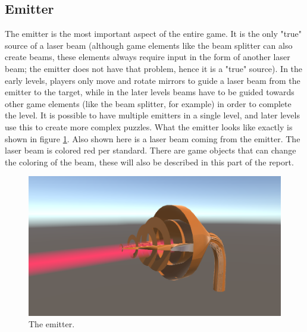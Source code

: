 		\subsection{Emitter} \label{ssec:emitter}
			The emitter is the most important aspect of the entire game.
			It is the only "true" source of a laser beam (although game
			elements like the beam splitter can also create beams, these
			elements always require input in the form of another laser
			beam; the emitter does not have that problem, hence it is a "true"
			source). In the early levels, players only move and rotate mirrors
			to guide a laser beam from the emitter to the target, while in the
			later levels beams have to be guided towards other game elements
			(like the beam splitter, for example) in order to complete the
			level. It is possible to have multiple emitters in a single level,
			and later levels use this to create more complex puzzles.
			What the emitter looks like exactly is shown in figure 
			\ref{fig:emitter}. Also shown here is a laser beam
			coming from the emitter. The laser beam is colored red per 
			standard. There are game objects that can change the coloring of 
			the beam, these will also be described in this part of the report.
			\begin{figure}[!ht]
				\centering
				\includegraphics[scale = 0.25]{Emitter}
				\caption{The emitter.}
				\label{fig:emitter}
			\end{figure}
			
